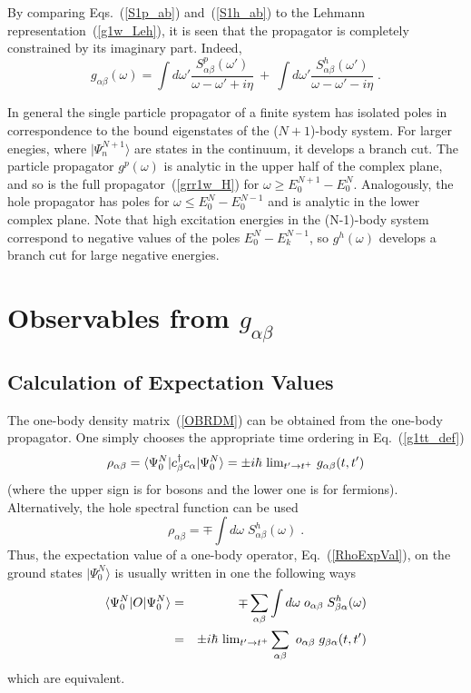 By comparing Eqs.~(\ref{S1p_ab}) and~(\ref{S1h_ab}) to the Lehmann representation~(\ref{g1w_Leh}), it is seen that the propagator is completely constrained by its imaginary part. Indeed,
\begin{equation}
g_{\alpha \beta}(\omega) 
 = \int d\omega' \frac{ S^p_{\alpha \beta}(\omega')  } {\omega - \omega' + i \eta} 
 ~+~ \int d\omega' \frac{ S^h_{\alpha \beta}(\omega')  } {\omega - \omega' - i \eta}  \; .
\label{g1_disp} 
\end{equation}

In general the single particle propagator of a finite system has isolated poles in correspondence to the bound eigenstates of the ($N+1$)-body system. For larger enegies, where $\vert \Psi^{N+1}_n \rangle$ are states in the continuum, it develops a branch cut. The particle propagator $g^p(\omega)$ is analytic in the upper half of the complex plane, and so is the full propagator~(\ref{grr1w_H}) for $\omega\geq E^{N+1}_0-E^N_0$.
 Analogously, the hole propagator has poles for $\omega\leq E^N_0-E^{N-1}_0$ and is analytic in the lower complex plane. Note that high excitation energies in the (N-1)-body system correspond to negative values of the poles $E^N_0-E^{N-1}_k$, so $g^h(\omega)$ develops a branch cut for large negative energies.


\newpage

\section{Observables from $g_{\alpha \beta}$}

\subsection{Calculation of Expectation Values}
\label{g1_ExpVal}

The one-body density matrix~(\ref{OBRDM}) can be obtained from the one-body propagator. One simply chooses the 
appropriate time ordering in Eq.~(\ref{g1tt_def})
\begin{equation}
 \rho_{\alpha \beta} = \langle \Psi^N_0 \vert c_\beta^\dag c_\alpha \vert \Psi^N_0 \rangle 
     = \pm i\hbar ~  \hbox{lim}_{t' \rightarrow t^+} ~ g_{\alpha \beta}(t,t')
\label{rho_vs_g1tt}
\end{equation}
 (where the upper sign is for bosons and the lower one is for fermions).
Alternatively, the hole spectral function can be used
\begin{equation}
 \rho _{\alpha \beta} = \mp \int d\omega \; S^h_{\alpha \beta}(\omega) \; .
\end{equation}
Thus, the expectation value of a one-body operator, Eq.~(\ref{RhoExpVal}), on the ground states $\vert \Psi^N_0 \rangle$ is usually written in one the following ways
\begin{eqnarray}
 \langle \Psi^N_0 \vert O \vert \Psi^N_0 \rangle &=&
 \mp \sum_{\alpha \beta}  \int d\omega \; o_{\alpha \beta} \; S^h_{\beta \alpha}(\omega)
\nonumber \\
 &=&  \pm i\hbar ~  \hbox{lim}_{t' \rightarrow t^+} 
\sum_{\alpha \beta}  ~  o_{\alpha \beta} \; g_{\beta \alpha}(t,t')
\label{g1ExpVal}
\end{eqnarray}
which are equivalent.

